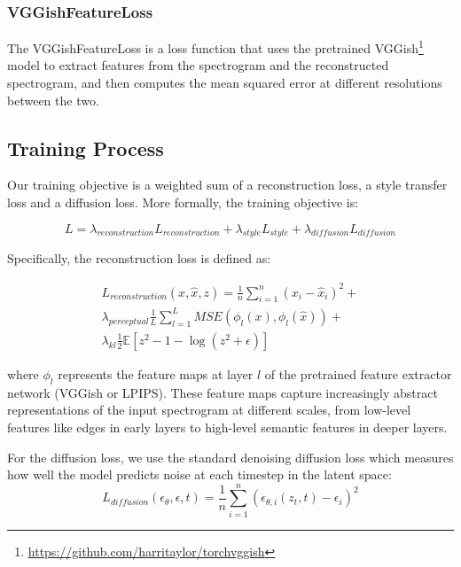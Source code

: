 \subsubsection{VGGishFeatureLoss}
The VGGishFeatureLoss is a loss function that uses the pretrained VGGish\footnote{\url{https://github.com/harritaylor/torchvggish}} model to extract features from the spectrogram and the reconstructed spectrogram, and then computes the mean squared error at different resolutions between the two. 


\subsection{Training Process}

Our training objective is a weighted sum of a reconstruction loss, a style transfer loss and a diffusion loss. More formally, the training objective is:

\begin{equation}
    L = \lambda_{reconstruction}L_{reconstruction} + \lambda_{style}L_{style} + \lambda_{diffusion}L_{diffusion}
\end{equation}

\noindent Specifically, the reconstruction loss is defined as:

\begin{equation}
    \begin{split}
    L_{reconstruction}(x, \hat{x}, z) = \frac{1}{n}\sum_{i=1}^{n}(x_i - \hat{x}_i)^2 + \\
    \lambda_{perceptual} \frac{1}{L}\sum_{l=1}^{L} MSE(\phi_l(x), \phi_l(\hat{x})) + \\
    \lambda_{kl} \frac{1}{2}\mathbb{E}[z^2 - 1 - \log(z^2 + \epsilon)]
    \end{split}
\end{equation}

\noindent where $\phi_l$ represents the feature maps at layer $l$ of the pretrained feature extractor network (VGGish or LPIPS). These feature maps capture increasingly abstract representations of the input spectrogram at different scales, from low-level features like edges in early layers to high-level semantic features in deeper layers.

\vspace{1em}

\noindent For the diffusion loss, we use the standard denoising diffusion loss which measures how well the model predicts noise at each timestep in the latent space:
\begin{equation}
L_{diffusion}(\epsilon_\theta, \epsilon, t) = \frac{1}{n}\sum_{i=1}^{n}(\epsilon_{\theta,i}(z_t, t) - \epsilon_i)^2
\end{equation}

